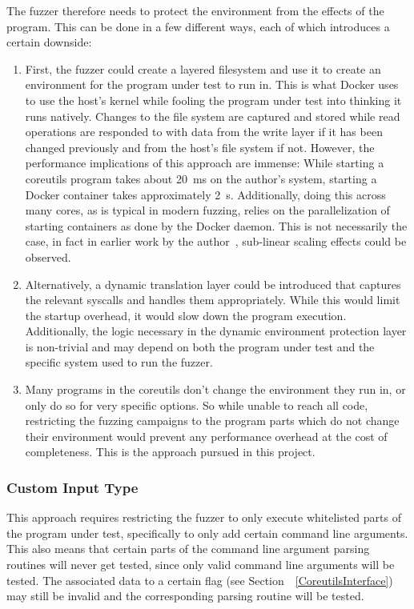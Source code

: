 \documentclass{article}
\let\savedCite=\cite
\renewcommand{\cite}{\unskip~\savedCite}
\let\savedRef=\ref
\renewcommand{\ref}{\unskip~\savedRef}
\begin{document}
\begin{multicols}{2}
    The fuzzer therefore needs to protect the environment from the effects of the program. This can be done in a few different ways, each of which introduces a certain downside:
    \begin{enumerate}
        \item First, the fuzzer could create a layered filesystem and use it to create an environment for the program under test to run in. This is what Docker uses to use the host's kernel while fooling the program under test into thinking it runs natively. Changes to the file system are captured and stored while read operations are responded to with data from the write layer if it has been changed previously and from the host's file system if not. However, the performance implications of this approach are immense: While starting a coreutils program takes about 20~ms on the author's system, starting a Docker container takes approximately 2~s. Additionally, doing this across many cores, as is typical in modern fuzzing, relies on the parallelization of starting containers as done by the Docker daemon. This is not necessarily the case, in fact in earlier work by the author\cite{VT1}, sub-linear scaling effects could be observed.
        \item Alternatively, a dynamic translation layer could be introduced that captures the relevant syscalls and handles them appropriately. While this would limit the startup overhead, it would slow down the program execution. Additionally, the logic necessary in the dynamic environment protection layer is non-trivial and may depend on both the program under test and the specific system used to run the fuzzer.
        \item Many programs in the coreutils don't change the environment they run in, or only do so for very specific options. So while unable to reach all code, restricting the fuzzing campaigns to the program parts which do not change their environment would prevent any performance overhead at the cost of completeness. This is the approach pursued in this project.
    \end{enumerate}

    \subsubsection{Custom Input Type}
    \label{CustomInputType}

    This approach requires restricting the fuzzer to only execute whitelisted parts of the program under test, specifically to only add certain command line arguments. This also means that certain parts of the command line argument parsing routines will never get tested, since only valid command line arguments will be tested. The associated data to a certain flag (see Section~\ref{CoreutilsInterface}) may still be invalid and the corresponding parsing routine will be tested.


\end{multicols}
\end{document}
